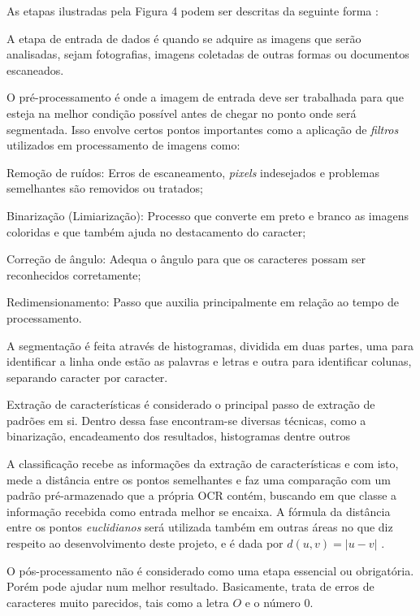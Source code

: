As etapas ilustradas pela Figura 4 podem ser descritas da seguinte forma \cite{shah2013literature}:

\begin{alineas}
\item A etapa de entrada de dados é quando se adquire as imagens que serão analisadas, sejam fotografias, imagens coletadas de outras formas ou documentos escaneados. 
\item O pré-processamento é onde a imagem de entrada deve ser trabalhada para que esteja na melhor condição possível antes de chegar no ponto onde será segmentada. Isso envolve certos pontos importantes como a aplicação de \textit{filtros} utilizados em processamento de imagens como:
	\begin{subalineas}
		\item Remoção de ruídos: Erros de escaneamento, \textit{pixels} indesejados e problemas 			semelhantes são removidos ou tratados;
		\item Binarização (Limiarização): Processo que converte em preto e branco as imagens coloridas e que 	também ajuda no destacamento do caracter;
		\item Correção de ângulo: Adequa o ângulo para que os caracteres possam ser reconhecidos corretamente;
		\item Redimensionamento: Passo que auxilia principalmente em relação ao tempo de 					processamento.
	\end{subalineas} 
\item A segmentação é feita através de histogramas, dividida em duas partes, uma para identificar a linha onde estão as palavras e letras e outra para identificar colunas, separando caracter por caracter.
\item Extração de características é considerado o principal passo de extração de padrões em si. Dentro dessa fase encontram-se diversas técnicas, como a binarização, encadeamento dos resultados, histogramas dentre outros
\item A classificação recebe as informações da extração de características e com isto, mede a distância entre os pontos semelhantes e faz uma comparação com um padrão pré-armazenado que a própria OCR contém, buscando em que classe a informação recebida como entrada melhor se encaixa. A fórmula da distância entre os pontos \textit{euclidianos} será utilizada também em outras áreas no que diz respeito ao desenvolvimento deste projeto, e é dada por $ d(u , v) = |u - v| $ \cite{steinbruch1975algebra}.

\item O pós-processamento não é considerado como uma etapa essencial ou obrigatória. Porém pode ajudar num melhor resultado. Basicamente, trata de erros de caracteres muito parecidos, tais como a letra $O$ e o número $0$. 
\end{alineas}

